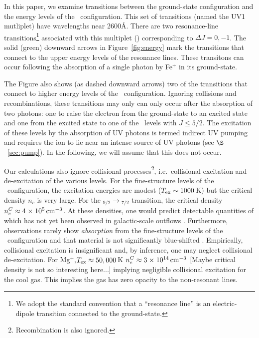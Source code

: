\documentclass[12pt,preprint]{aastex}
\begin{document}
In this paper, we examine transitions between the ground-state
configuration and the energy levels of the \zconfig\
configuration.  This set of transitions (named the
UV1 mutliplet) have wavelengths near 2600\AA.
There are two resonance-line transitions\footnote{We adopt the
  standard convention that a ``resonance line'' is an electric-dipole
  transition connected to the ground-state.} 
associated with this multiplet (\feiid)
corresponding to $\Delta J = 0, -1$.  The solid (green) downward
arrows in Figure~\ref{fig:energy} mark the transitions that connect to
the upper energy levels of the resonance lines.  These transitons can
occur following the absorption of a single photon by Fe$^+$ in its
ground-state.  

The Figure also shows (as dashed downward arrows) two of the
transitions that connect to higher energy levels of the \zconfig\
configuration.  Ignoring collisions and recombinations, these
transitions may only can only occur after the absorption
of two photons: one to raise the electron from the ground-state to an
excited state and one from the excited state to one of the \zconfig\
levels with $J \le 5/2$.  The excitation of these levels by
the absorption of UV photons is termed indirect UV pumping
\citep[e.g][]{sv02,pcb06} and requires the ion to lie
near an intense source of UV photons (see $\S$~\ref{sec:pump}).  In the
following, we will assume that this does not occur. 

Our calculations also ignore collisional
processes\footnote{Recombination is also ignored.}, i.e.\ collisional
excitation and de-excitation of the various levels.  For the
fine-structure levels of the \aconfig\ configuration, the excitation
energies are modest ($T_{\rm ex} \sim 1000$\,K) but the critical
density $n_c$ is very large.  For the \aconfig$_{9/2} \to
$\aconfig$_{7/2}$ transition, the critical density $n_e^C \approx 4
{\; \times \; 10^{5}} \, {\rm cm^{-3}}$.  At these densities, one would predict  
detectable quantities of \ion{Fe}{1} which has not yet been observed
in galactic-scale outflows
\citep[see also][]{pcb06}.  Furthermore, observations rarely show
{\it absorption} from the
fine-structure levels of the \aconfig\ configuration and that material
is not significantly blue-shifted \citep{rubin+10}.
Empirically, collisional excitation is insignificant and, by
inference, one may neglect collisional de-excitation.  
For Mg$^+$,$T_{\rm ex} \approx 50,000$\,K  
$n_e^C \approx 3 {\; \times \; 10^{14}} \, {\rm cm^{-3}}$  [Maybe critical density is
not so interesting here...]
implying negligible collisional excitation for the cool gas.  
This implies the gas has zero opacity to the non-resonant lines.
\end{document}

